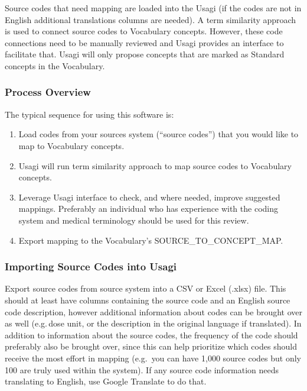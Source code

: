 \documentclass[11pt]{book}
\providecommand{\tightlist}{%
  \setlength{\itemsep}{0pt}\setlength{\parskip}{0pt}}
\theoremstyle{definition}
\theoremstyle{definition}
\theoremstyle{definition}
\theoremstyle{remark}
\begin{document}
Source codes that need mapping are loaded into the Usagi (if the codes are not in English additional translations columns are needed). A term similarity approach is used to connect source codes to Vocabulary concepts. However, these code connections need to be manually reviewed and Usagi provides an interface to facilitate that. Usagi will only propose concepts that are marked as Standard concepts in the Vocabulary.

\hypertarget{process-overview-2}{%
\subsubsection*{Process Overview}\label{process-overview-2}}

The typical sequence for using this software is:

\begin{enumerate}
\def\labelenumi{\arabic{enumi}.}
\tightlist
\item
  Load codes from your sources system (``source codes'') that you would like to map to Vocabulary concepts.
\item
  Usagi will run term similarity approach to map source codes to Vocabulary concepts.
\item
  Leverage Usagi interface to check, and where needed, improve suggested mappings. Preferably an individual who has experience with the coding system and medical terminology should be used for this review.
\item
  Export mapping to the Vocabulary's SOURCE\_TO\_CONCEPT\_MAP.
\end{enumerate}

\hypertarget{importing-source-codes-into-usagi}{%
\subsubsection*{Importing Source Codes into Usagi}\label{importing-source-codes-into-usagi}}

Export source codes from source system into a CSV or Excel (.xlsx) file. This should at least have columns containing the source code and an English source code description, however additional information about codes can be brought over as well (e.g.\,dose unit, or the description in the original language if translated). In addition to information about the source codes, the frequency of the code should preferably also be brought over, since this can help prioritize which codes should receive the most effort in mapping (e.g.~you can have 1,000 source codes but only 100 are truly used within the system). If any source code information needs translating to English, use Google Translate to do that.
\end{document}
